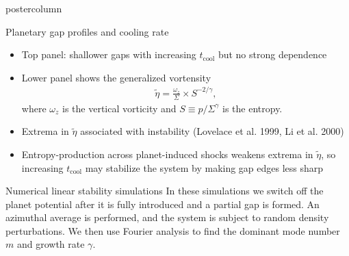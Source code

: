 \documentclass[final,hyperref={pdfpagelabels=false}]{beamer}
\begin{document}
\begin{frame}
\begin{columns}
\begin{column}{.49\textwidth}
\begin{beamercolorbox}[center,wd=\textwidth]{postercolumn}
\begin{minipage}[T]{.95\textwidth}
{\begin{block}{{\Large Planetary gap profiles and cooling
              rate}}
\begin{minipage}[t]{0.49\textwidth}
\begin{figure}
            \end{figure}
          \end{minipage}
          \begin{minipage}[t]{0.49\textwidth}
            \begin{itemize}
            \item Top panel: shallower gaps with increasing $t_\mathrm{cool}$ 
              but no strong dependence 
            \item Lower panel shows the generalized vortensity
              \begin{align*}
                \tilde{\eta} = \frac{\omega_z}{\Sigma}\times S^{-2/\gamma},
              \end{align*}
              where $\omega_z$ is the vertical vorticity and $S\equiv
              p/\Sigma^\gamma$ is the entropy. 
            \item Extrema in $\tilde{\eta}$ associated with
              instability (Lovelace et al. 1999, Li et al. 2000)
            \item Entropy-production across planet-induced shocks
              weakens extrema in $\tilde{\eta}$, so
             increasing $t_\mathrm{cool}$ may stabilize the
              system by making gap edges less sharp
            \end{itemize}
          \end{minipage}
        \end{block}
        \vfill
        \begin{block}{{\Large Numerical linear stability simulations}}
          \justifying
          In these simulations we switch off the planet potential after it is fully
          introduced and a partial gap is formed. An azimuthal
          average is performed, and the system is subject to random
          density perturbations. We then use Fourier analysis to find
          the dominant mode number $m$ and growth rate $\gamma$.  
          \\   
          \vspace{-2cm}

\end{block}}
\end{minipage}
\end{beamercolorbox}
\end{column}
\end{columns}
\end{frame}
\end{document}
